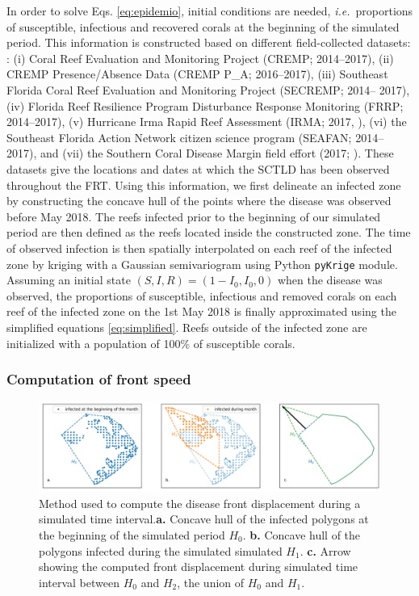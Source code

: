 \documentclass[utf8]{frontiersSCNS}
\newcommand{\ie}{{\it i.e.}\ }
\begin{document}
In order to solve Eqs. \ref{eq:epidemio}, initial conditions are needed, \ie proportions of susceptible, infectious and recovered corals at the beginning of the simulated period. This information is constructed based on different field-collected datasets: : (i) Coral Reef Evaluation and Monitoring Project (CREMP; 2014–2017), (ii) CREMP Presence/Absence Data (CREMP P\_A; 2016–2017), (iii) Southeast Florida Coral Reef Evaluation and Monitoring Project (SECREMP; 2014– 2017), (iv) Florida Reef Resilience Program Disturbance Response Monitoring (FRRP; 2014–2017), (v) Hurricane Irma Rapid Reef Assessment (IRMA; 2017, \cite{viehman2018}), (vi) the Southeast Florida Action Network citizen science program (SEAFAN; 2014–2017), and (vii) the Southern Coral Disease Margin field effort (2017; \cite{neely2018surveying}). These datasets give the locations and dates at which the SCTLD has been observed throughout the FRT. Using this information, we first delineate an infected zone by constructing the concave hull of the points where the disease was observed before May 2018. The reefs infected prior to the beginning of our simulated period are then defined as the reefs located inside the constructed zone. The time of observed infection is then spatially interpolated on each reef of the infected zone by kriging with a Gaussian semivariogram using Python \texttt{pyKrige} module. Assuming an initial state $(S,I,R)=(1-I_0, I_0, 0)$ when the disease was observed, the proportions of susceptible, infectious and removed corals on each reef of the infected zone on the 1st May 2018 is finally approximated using the simplified equations \ref{eq:simplified}. Reefs outside of the infected zone are initialized with a population of 100\% of susceptible corals.  

\subsubsection{Computation of front speed}

\begin{figure}
    \centering
    \includegraphics[width=.99\linewidth]{figures/hull_example.png}
    \caption{Method used to compute the disease front displacement during a simulated time interval.\textbf{a.} Concave hull of the infected polygons at the beginning of the simulated period $H_0$. \textbf{b.} Concave hull of the polygons infected during the simulated simulated $H_1$. \textbf{c.} Arrow showing the computed front displacement during simulated time interval between $H_0$ and $H_2$, the union of $H_0$ and $H_1$.}
    \label{fig:hull}
\end{figure}
\end{document}
